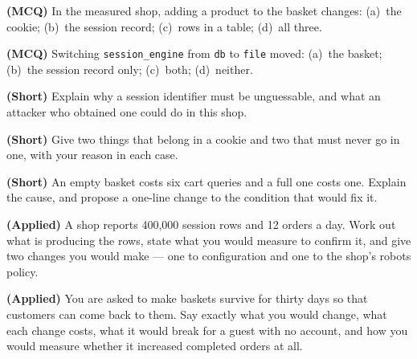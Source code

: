 \begin{reviewq}
  \item \textbf{(MCQ)} In the measured shop, adding a product to the basket
        changes: (a)~the cookie; (b)~the session record; (c)~rows in a table;
        (d)~all three.
  \item \textbf{(MCQ)} Switching \texttt{session\_engine} from \texttt{db} to
        \texttt{file} moved: (a)~the basket; (b)~the session record only;
        (c)~both; (d)~neither.
  \item \textbf{(Short)} Explain why a session identifier must be unguessable,
        and what an attacker who obtained one could do in this shop.
  \item \textbf{(Short)} Give two things that belong in a cookie and two that
        must never go in one, with your reason in each case.
  \item \textbf{(Short)} An empty basket costs six cart queries and a full one
        costs one. Explain the cause, and propose a one-line change to the
        condition that would fix it.
  \item \textbf{(Applied)} A shop reports 400{,}000 session rows and 12 orders
        a day. Work out what is producing the rows, state what you would
        measure to confirm it, and give two changes you would make --- one to
        configuration and one to the shop's robots policy.
  \item \textbf{(Applied)} You are asked to make baskets survive for thirty
        days so that customers can come back to them. Say exactly what you
        would change, what each change costs, what it would break for a guest
        with no account, and how you would measure whether it increased
        completed orders at all.
\end{reviewq}
